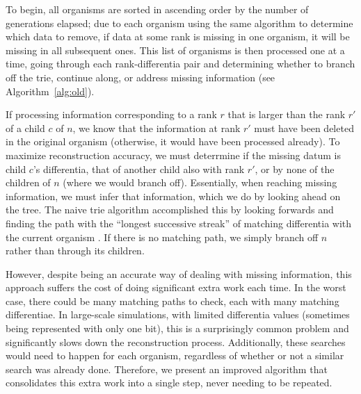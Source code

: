 To begin, all organisms are sorted in ascending order by the number of generations elapsed; due to each organism using the same algorithm to determine which data to remove, if data at some rank is missing in one organism, it will be missing in all subsequent ones.
This list of organisms is then processed one at a time, going through each rank-differentia pair and determining whether to branch off the trie, continue along, or address missing information (see Algorithm~\ref{alg:old}).

If processing information corresponding to a rank $r$ that is larger than the rank $r'$ of a child $c$ of $n$, we know that the information at rank $r'$ must have been deleted in the original organism (otherwise, it would have been processed already).
To maximize reconstruction accuracy, we must deterrmine if the missing datum is child $c$'s differentia, that of another child also with rank $r'$, or by none of the children of $n$ (where we would branch off).
Essentially, when reaching missing information, we must infer that information, which we do by looking ahead on the tree. The naive  trie algorithm accomplished this by looking forwards and finding the path with the ``longest successive streak'' of matching differentia with the current organism \citep{moreno2024analysis}.
If there is no matching path, we simply branch off $n$ rather than through its children.



However, despite being an accurate way of dealing with missing information, this approach suffers the cost of doing significant extra work each time.
In the worst case, there could be many matching paths to check, each with many matching differentiae.
In large-scale simulations, with limited differentia values (sometimes being represented with only one bit), this is a surprisingly common problem and significantly slows down the reconstruction process.
Additionally, these searches would need to happen for each organism, regardless of whether or not a similar search was already done.
Therefore, we present an improved algorithm that consolidates this extra work into a single step, never needing to be repeated.
